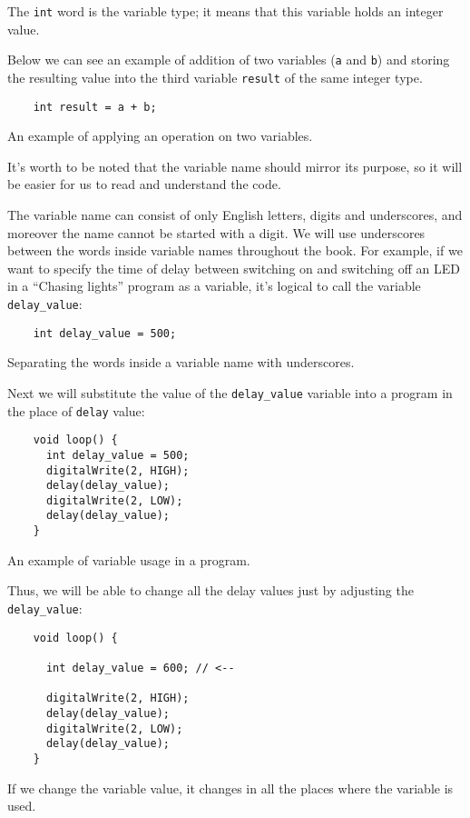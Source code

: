 \documentclass[../sparc.tex]{subfiles}
\begin{document}
The \texttt{int} word is the variable type; it means that this variable holds an
integer value.

Below we can see an example of addition of two variables (\texttt{a} and
\texttt{b}) and storing the resulting value into the third variable
\texttt{result} of the same integer type.

\begin{listing}[ht]
  \begin{verbatim}
    int result = a + b;
  \end{verbatim}
  \label{listing:dialogues-with-computer-variable-operations-example}
  \caption{An example of applying an operation on two variables.}
\end{listing}

It's worth to be noted that the variable name should mirror its purpose, so it
will be easier for us to read and understand the code.

The variable name can consist of only English letters, digits and underscores,
and moreover the name cannot be started with a digit.  We will use underscores
between the words inside variable names throughout the book.  For example, if we
want to specify the time of delay between switching on and switching off an LED
in a ``Chasing lights'' program as a variable, it's logical to call the variable
\texttt{delay\_value}:

\begin{listing}[ht]
  \begin{verbatim}
    int delay_value = 500;
  \end{verbatim}
  \label{listing:dialogues-with-computer-variable-names}
  \caption{Separating the words inside a variable name with underscores.}
\end{listing}

Next we will substitute the value of the \texttt{delay\_value} variable into a
program in the place of \texttt{delay} value:

\begin{listing}[ht]
  \begin{verbatim}
    void loop() {
      int delay_value = 500;
      digitalWrite(2, HIGH);
      delay(delay_value);
      digitalWrite(2, LOW);
      delay(delay_value);
    }
  \end{verbatim}
  \label{listing:dialogues-with-computer-variable-usage}
  \caption{An example of variable usage in a program.}
\end{listing}

Thus, we will be able to change all the delay values just by adjusting the
\texttt{delay\_value}:

\begin{listing}[ht]
  \begin{verbatim}
    void loop() {

      int delay_value = 600; // <--

      digitalWrite(2, HIGH);
      delay(delay_value);
      digitalWrite(2, LOW);
      delay(delay_value);
    }
  \end{verbatim}
  \label{listing:dialogues-with-computer-variable-set-value}
  \caption{If we change the variable value, it changes in all the places where
    the variable is used.}
\end{listing}
\end{document}
